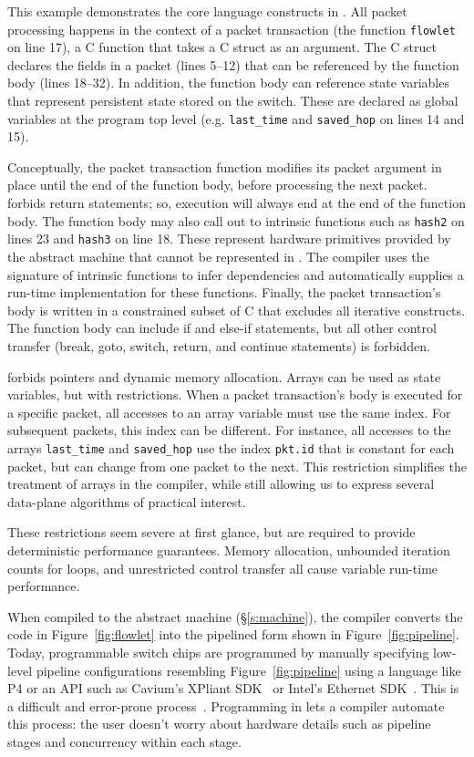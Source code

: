 This example demonstrates the core language constructs in \pktlanguage. All
packet processing happens in the context of a packet transaction (the function
\texttt{flowlet} on line 17), a C function that takes a C struct as an
argument. The C struct declares the fields in a packet (lines 5--12) that can
be referenced by the function body (lines 18--32).  In addition, the function
body can reference state variables that represent persistent state stored on
the switch. These are declared as global variables at the program top level
(e.g. \texttt{last\_time} and \texttt{saved\_hop} on lines 14 and 15).

Conceptually, the packet transaction function modifies its packet argument in
place until the end of the function body, before processing the next packet.
\pktlanguage forbids return statements; so, execution will always end at the
end of the function body. The function body may also call out to intrinsic
functions such as \texttt{hash2} on lines 23 and \texttt{hash3} on line 18.
These represent hardware primitives provided by the abstract machine that
cannot be represented in \pktlanguage. The \pktlanguage compiler uses the
signature of intrinsic functions to infer dependencies and automatically
supplies a run-time implementation for these functions. Finally, the packet
transaction's body is written in a constrained subset of C that excludes all
iterative constructs. The function body can include if and else-if statements,
but all other control transfer (break, goto, switch, return, and continue
statements) is forbidden.

\pktlanguage forbids pointers and dynamic memory allocation. Arrays can be used
as state variables, but with restrictions. When a packet transaction's body is
executed for a specific packet, all accesses to an array variable must use the
same index. For subsequent packets, this index can be different. For instance,
all accesses to the arrays \texttt{last\_time} and \texttt{saved\_hop} use the
index \texttt{pkt.id} that is constant for each packet, but can change from one
packet to the next. This restriction simplifies the treatment of arrays in the
compiler, while still allowing us to express several data-plane algorithms of
practical interest.

These restrictions seem severe at first glance, but are required to provide
deterministic performance guarantees. Memory allocation, unbounded iteration
counts for loops, and unrestricted control transfer all cause variable run-time
performance.

When compiled to the \absmachine abstract machine (\S\ref{s:machine}), the
\pktlanguage compiler converts the code in Figure~\ref{fig:flowlet} into the
pipelined form shown in Figure~\ref{fig:pipeline}. Today, programmable switch
chips are programmed by manually specifying low-level pipeline configurations
resembling Figure~\ref{fig:pipeline} using a language like P4 or an API such as
Cavium's XPliant SDK~\cite{xpliant_sdk} or Intel's Ethernet
SDK~\cite{intel_sdk}. This is a difficult and error-prone
process~\cite{p4-semantics}.  Programming in \pktlanguage lets a compiler
automate this process: the user doesn't worry about hardware details such as
pipeline stages and concurrency within each stage.
